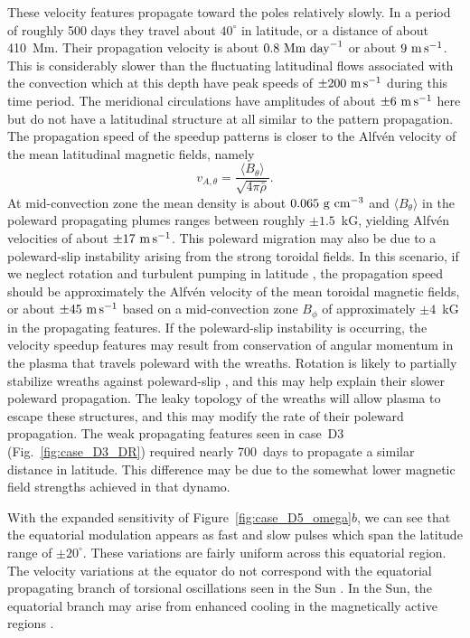 These velocity features propagate toward the poles relatively
slowly.  In a period of roughly 500 days they travel about $40^\circ$
in latitude, or a distance of about 410~Mm.  Their propagation
velocity is about $0.8~\mathrm{Mm}\thinspace\thinspace\mathrm{day}^{-1}$ or about 
$9~\mathrm{m}\thinspace \mathrm{s}^{-1}$.  This is considerably slower than
the fluctuating latitudinal flows associated with the convection which
at this depth have peak speeds of $\pm 200~\mathrm{m}\thinspace \mathrm{s}^{-1}$
during this time period.  The meridional circulations have
amplitudes of about $\pm 6~\mathrm{m}\thinspace \mathrm{s}^{-1}$ here but do
not have a latitudinal structure at all similar to the pattern
propagation.   
The propagation speed of the speedup patterns is closer to the Alfv\'en
velocity of the mean latitudinal magnetic fields, namely
\begin{equation}
  v_{A,\theta} = \frac{\langle B_\theta \rangle}{\sqrt{4 \pi \bar{\rho}}}.
\end{equation}
At mid-convection zone the mean density is about
$0.065~\mathrm{g}\thinspace\thinspace\mathrm{cm}^{-3}$ and $\langle B_\theta \rangle$ in
the poleward propagating plumes ranges between roughly $\pm 1.5$~kG,
yielding Alfv\'en velocities of about $\pm 17~\mathrm{m}\thinspace \mathrm{s}^{-1}$.   
This poleward migration may also be due to a poleward-slip instability
arising from the strong toroidal fields.  In this scenario, if we
neglect rotation and turbulent pumping in latitude \citep[e.g.,][]{Moreno-Insertis_et_al_1992,Jouve&Brun_2009}, the
propagation speed should be approximately the Alfv\'en velocity of the
mean toroidal magnetic fields, or about $\pm
45~\mathrm{m}\thinspace \mathrm{s}^{-1}$ based on a mid-convection zone $B_\phi$
of approximately $\pm 4$~kG in the propagating features.  
If the poleward-slip instability is
occurring, the velocity speedup features may result from conservation
of angular momentum in the plasma that travels poleward with the wreaths.
Rotation is likely to partially stabilize wreaths against poleward-slip
\citep{Moreno-Insertis_et_al_1992},  and this may help explain their
slower poleward propagation.  
The leaky topology of the wreaths will allow plasma to
escape these structures, and this may modify the rate of their 
poleward propagation.  The weak propagating features seen in
case~D3 (Fig.~\ref{fig:case_D3_DR}) required nearly 700~days to
propagate a similar distance in latitude.  This difference may be due
to the somewhat lower magnetic field strengths achieved in that dynamo.

With the expanded sensitivity of Figure~\ref{fig:case_D5_omega}$b$, 
we can see that the equatorial modulation appears as fast and slow
pulses which span the latitude range of $\pm20^\circ$.  These
variations are fairly uniform across this equatorial region.  
The velocity variations at the equator do not correspond with the
equatorial propagating branch of torsional oscillations seen in the
Sun \citep{Thompson_et_al_2003}.  In the Sun, the equatorial branch
may arise from enhanced cooling in the magnetically active regions
\citep[e.g.,][]{Spruit_2003, Rempel_2006, Rempel_2007}.

